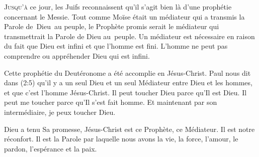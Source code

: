 \dvrule







\lettrine{J}{usqu'à} ce jour, les Juifs reconnaissent
 qu'il s'agit bien là d'une prophétie concernant le Messie.
 Tout comme Moïse était un médiateur qui a transmis la Parole de~Dieu~au peuple,
 le Prophète promis serait le médiateur qui transmettrait la Parole de Dieu
 au~peuple.
 Un médiateur est nécessaire en raison du fait que Dieu est infini
 et que l'homme est fini.
 L'homme ne peut pas comprendre ou appréhender Dieu qui est infini.


Cette prophétie du Deutéronome a été accomplie en Jésus-Christ.
 Paul nous dit dans (2:5)
 qu'il y a un seul Dieu
 et un seul Médiateur entre Dieu et les hommes,
 et que c'est l'homme Jésus-Christ. Il peut toucher Dieu parce qu'Il est Dieu.
 Il peut me toucher parce qu'Il s'est fait homme.
 Et maintenant par son intermédiaire, je peux toucher Dieu.

Dieu a tenu Sa promesse, Jésus-Christ est ce Prophète, ce Médiateur.
 Il est notre réconfort. Il est la Parole par laquelle nous avons la vie,
 la force, l'amour, le pardon, l'espérance et la paix. 

